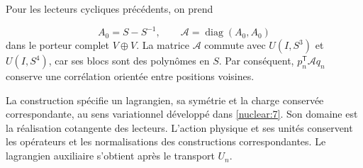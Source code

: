 Pour les lecteurs cycliques précédents, on prend

\[
 A_0=S-S^{-1},\qquad
 \mathcal A=\operatorname{diag}(A_0,A_0)
\]
dans le porteur complet \(V\oplus V\).
La matrice \(\mathcal A\) commute avec \(U(I,S^3)\) et
\(U(I,S^4)\), car ses blocs sont des polynômes en \(S\).
Par conséquent, \(p_n^{\mathsf T}\mathcal A q_n\) conserve
une corrélation orientée entre positions voisines.

La construction spécifie un lagrangien, sa symétrie et la charge
conservée correspondante, au sens variationnel développé
dans \cref{nuclear:7}.
Son domaine est la réalisation cotangente des lecteurs.
L’action physique et ses unités conservent les opérateurs et les
normalisations des constructions correspondantes.
Le lagrangien auxiliaire s’obtient après le transport \(U_n\).
